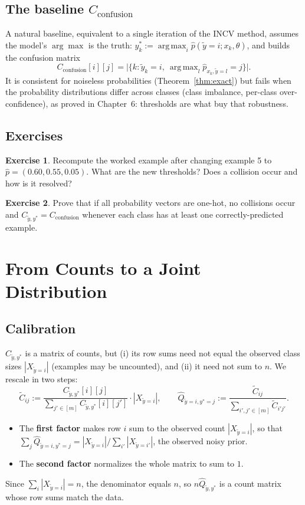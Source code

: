 \documentclass[11pt,a4paper]{report}
\newcommand{\Cyy}{C_{\tilde y,y^*}}
\newcommand{\Cconf}{C_{\text{confusion}}}
\newcommand{\argmax}{\operatorname*{arg\,max}}
\newcommand{\1}{\mathbf 1}
\theoremstyle{definition}
\newtheorem{exercise}{Exercise}[chapter]
\theoremstyle{plain}
\theoremstyle{remark}
\begin{document}
\section{The baseline $C_{\text{confusion}}$}
A natural baseline, equivalent to a single iteration of the INCV method, assumes the model's $\arg\max$ is the truth: $y^*_k:=\argmax_i\hat p(\tilde y=i;x_k,\theta)$, and builds the confusion matrix
\[\Cconf[i][j]=\bigl|\{k:\tilde y_k=i,\ \argmax\nolimits_l\hat p_{x_k,\tilde y=l}=j\}\bigr|.\] It is consistent for noiseless probabilities (Theorem~\ref{thm:exact}) but fails when the probability distributions differ across classes (class imbalance, per-class over-confidence), as proved in Chapter~6: thresholds are what buy that robustness.

\section*{Exercises}
\begin{exercise}
Recompute the worked example after changing example 5 to $\hat p=(0.60,0.55,0.05)$. What are the new thresholds? Does a collision occur and how is it resolved?
\end{exercise}
\begin{exercise}
Prove that if all probability vectors are one-hot, no collisions occur and $\Cyy=\Cconf$ whenever each class has at least one correctly-predicted example.
\end{exercise}

\chapter{From Counts to a Joint Distribution}

\section{Calibration}
$\Cyy$ is a matrix of counts, but (i) its row sums need not equal the observed class sizes $|X_{\tilde y=i}|$ (examples may be uncounted), and (ii) it need not sum to $n$. We rescale in two steps:
\begin{equation}\label{eq:joint}
\tilde C_{ij}:=\frac{\Cyy[i][j]}{\sum_{j'\in[m]}\Cyy[i][j']}\cdot|X_{\tilde y=i}|,\qquad
\hat Q_{\tilde y=i,y^*=j}:=\frac{\tilde C_{ij}}{\sum_{i',j'\in[m]}\tilde C_{i'j'}}.
\end{equation}
\begin{itemize}
  \item The \textbf{first factor} makes row $i$ sum to the observed count $|X_{\tilde y=i}|$, so that
  $\sum_j\hat Q_{\tilde y=i,y^*=j}=|X_{\tilde y=i}|/\sum_{i'}|X_{\tilde y=i'}|$, the observed noisy prior.
  \item The \textbf{second factor} normalizes the whole matrix to sum to $1$.
\end{itemize}
Since $\sum_i |X_{\tilde y=i}|=n$, the denominator equals $n$, so $n\hat Q_{\tilde y,y^*}$ is a count matrix whose row sums match the data.
\end{document}
